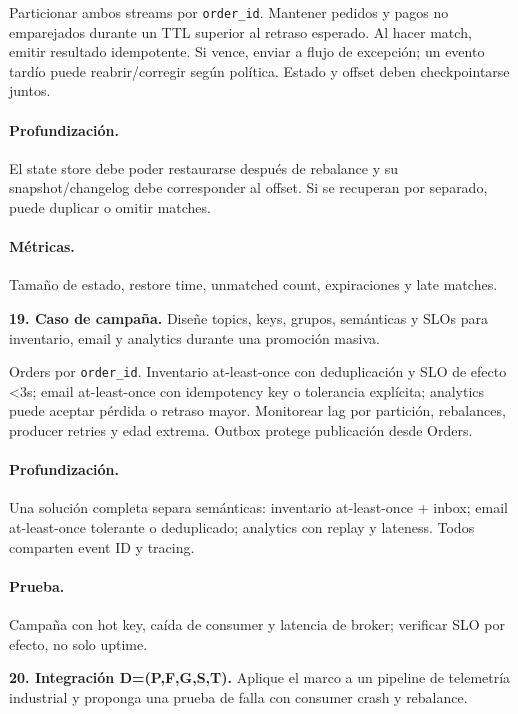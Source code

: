 \documentclass[variant=guiaresuelta,cover=institutional,mode=screen]{ua-engineering-v6-article}
\begin{document}
\begin{uaanswer}
Particionar ambos streams por \texttt{order\_id}. Mantener pedidos y pagos no emparejados durante un TTL superior al retraso esperado. Al hacer match, emitir resultado idempotente. Si vence, enviar a flujo de excepción; un evento tardío puede reabrir/corregir según política. Estado y offset deben checkpointarse juntos.

\paragraph{Profundización.} El state store debe poder restaurarse después de rebalance y su snapshot/changelog debe corresponder al offset. Si se recuperan por separado, puede duplicar o omitir matches.\paragraph{Métricas.} Tamaño de estado, restore time, unmatched count, expiraciones y late matches.
\end{uaanswer}
\begin{uaexercise}
\textbf{19. Caso de campaña.} Diseñe topics, keys, grupos, semánticas y SLOs para inventario, email y analytics durante una promoción masiva.
\end{uaexercise}
\begin{uaanswer}
Orders por \texttt{order\_id}. Inventario at-least-once con deduplicación y SLO de efecto <3s; email at-least-once con idempotency key o tolerancia explícita; analytics puede aceptar pérdida o retraso mayor. Monitorear lag por partición, rebalances, producer retries y edad extrema. Outbox protege publicación desde Orders.

\paragraph{Profundización.} Una solución completa separa semánticas: inventario at-least-once + inbox; email at-least-once tolerante o deduplicado; analytics con replay y lateness. Todos comparten event ID y tracing.\paragraph{Prueba.} Campaña con hot key, caída de consumer y latencia de broker; verificar SLO por efecto, no solo uptime.
\end{uaanswer}
\begin{uaexercise}
\textbf{20. Integración D=(P,F,G,S,T).} Aplique el marco a un pipeline de telemetría industrial y proponga una prueba de falla con consumer crash y rebalance.
\end{uaexercise}
\end{document}
